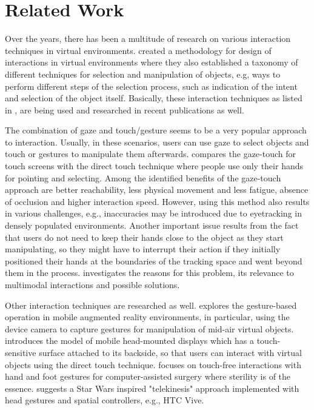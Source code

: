 \section{Related Work}
Over the years, there has been a multitude of research on various interaction techniques in virtual environments. \cite{bowman1999} created a methodology for design of interactions in virtual environments where they also established a taxonomy of different techniques for selection and manipulation of objects, e.g, ways to perform different steps of the selection process, such as indication of the intent and selection of the object itself. Basically, these interaction techniques as listed in \cite{bowman1999}, are being used and researched in recent publications as well.

The combination of gaze and touch/gesture seems to be a very popular approach to interaction. Usually, in these scenarios, users can use gaze to select objects and touch or gestures to manipulate them afterwards. \cite{pfeuffer2014} compares the gaze-touch for touch screens with the direct touch technique where people use only their hands for pointing and selecting. Among the identified benefits of the gaze-touch approach are better reachability, less physical movement and less fatigue, absence of occlusion and higher interaction speed. However, using this method also results in various challenges, e.g., inaccuracies may be introduced due to eyetracking in densely populated environments. Another important issue results from the fact that users do not need to keep their hands close to the object as they start manipulating, so they might have to interrupt their action if they initially positioned their hands at the boundaries of the tracking space and went beyond them in the process. \cite{deng2017} investigates the reasons for this problem, its relevance to multimodal interactions and possible solutions.

Other interaction techniques are researched as well. \cite{hurst2013gesture} explores the gesture-based operation in mobile augmented reality environments, in particular, using the device camera to capture gestures for manipulation of mid-air virtual objects. \cite{gugenheimer2016} introduces the model of mobile head-mounted displays which has a touch-sensitive surface attached to its backside, so that users can interact with virtual objects using the direct touch technique. \cite{reinschluessel2017} focuses on touch-free interactions with hand and foot gestures for computer-assisted surgery where sterility is of the essence. \cite{clifford2017} suggests a Star Wars inspired "telekinesis" approach implemented with head gestures and spatial controllers, e.g., HTC Vive.